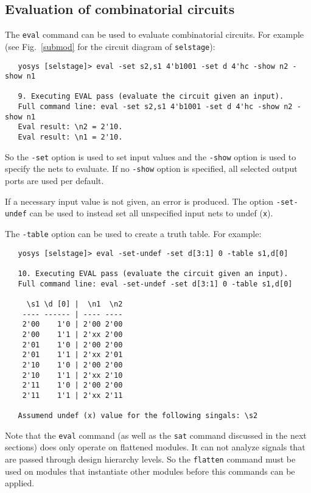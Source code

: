 \documentclass[9pt,technote,a4paper]{IEEEtran}
\begin{document}
\subsection{Evaluation of combinatorial circuits}

The {\tt eval} command can be used to evaluate combinatorial circuits.
For example (see Fig.~\ref{submod} for the circuit diagram of {\tt selstage}):

{\scriptsize
\begin{verbatim}
   yosys [selstage]> eval -set s2,s1 4'b1001 -set d 4'hc -show n2 -show n1

   9. Executing EVAL pass (evaluate the circuit given an input).
   Full command line: eval -set s2,s1 4'b1001 -set d 4'hc -show n2 -show n1
   Eval result: \n2 = 2'10.
   Eval result: \n1 = 2'10.
\end{verbatim}
\par}

So the {\tt -set} option is used to set input values and the {\tt -show} option
is used to specify the nets to evaluate. If no {\tt -show} option is specified,
all selected output ports are used per default.

If a necessary input value is not given, an error is produced. The option
{\tt -set-undef} can be used to instead set all unspecified input nets to
undef ({\tt x}).

The {\tt -table} option can be used to create a truth table. For example:

{\scriptsize
\begin{verbatim}
   yosys [selstage]> eval -set-undef -set d[3:1] 0 -table s1,d[0]

   10. Executing EVAL pass (evaluate the circuit given an input).
   Full command line: eval -set-undef -set d[3:1] 0 -table s1,d[0]

     \s1 \d [0] |  \n1  \n2
    ---- ------ | ---- ----
    2'00    1'0 | 2'00 2'00
    2'00    1'1 | 2'xx 2'00
    2'01    1'0 | 2'00 2'00
    2'01    1'1 | 2'xx 2'01
    2'10    1'0 | 2'00 2'00
    2'10    1'1 | 2'xx 2'10
    2'11    1'0 | 2'00 2'00
    2'11    1'1 | 2'xx 2'11

   Assumend undef (x) value for the following singals: \s2
\end{verbatim}
}

Note that the {\tt eval} command (as well as the {\tt sat} command discussed in
the next sections) does only operate on flattened modules. It can not analyze
signals that are passed through design hierarchy levels. So the {\tt flatten}
command must be used on modules that instantiate other modules before this
commands can be applied.
\end{document}
